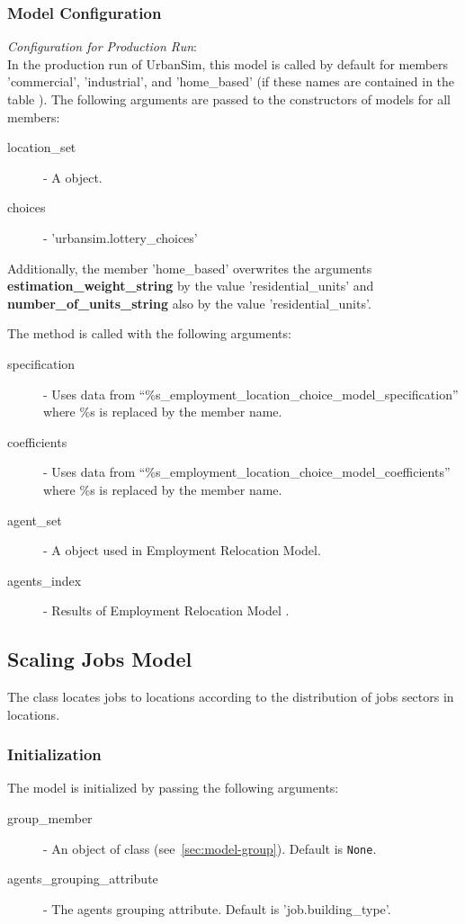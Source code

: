 \subsubsection{Model Configuration}
\modelsindex
%
{\em Configuration for Production Run}:\\[1mm]
In the production run of UrbanSim, this model is called by default for members 'commercial', 'industrial', and 'home_based'
 (if these names are contained in the table ). 
 The following arguments are passed to the constructors of models for all members:
\begin{description}
\item[location_set] - A  object.
\item[choices] - 'urbansim.lottery_choices'
\end{description}
Additionally, the member 'home_based' overwrites the arguments {\bf estimation_weight_string} by the value 'residential_units' 
and {\bf number_of_units_string} also by the value 'residential_units'.

The  method is called with the following arguments:
\begin{description}
\item[specification] - Uses data from
  ``\%s_employment_location_choice_model_specification'' where \%s is replaced by the member name.
\item[coefficients] - Uses data from ``\%s_employment_location_choice_model_coefficients'' 
    where \%s is replaced by the member name.\modelsindex
\item[agent_set] - A  object used in Employment Relocation Model. 
\item[agents_index] - Results of Employment Relocation Model .
\end{description}
 
\subsection{Scaling Jobs Model}
\modelsindex
%
\label{sec:scaling-jobs-model} 
%
The class  locates jobs to locations according to the
distribution of jobs sectors in locations. 
\subsubsection{Initialization}
The model is initialized by passing the following arguments:
\begin{description}
\item[group_member] - An object of class  (see~\ref{sec:model-group}). Default is \verb|None|.
\item[agents_grouping_attribute] - The agents grouping attribute. Default is 'job.building_type'.
\end{description}

